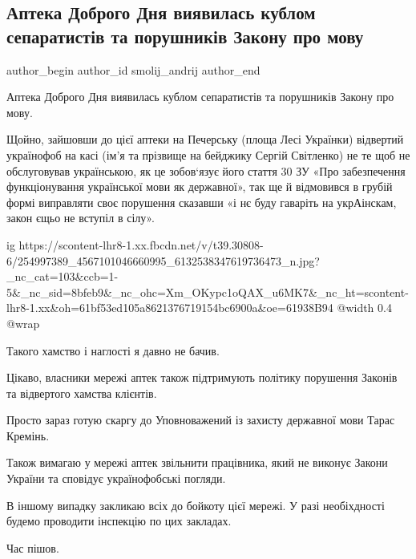  
 
 
 
 
 
\subsection{Аптека Доброго Дня виявилась кублом сепаратистів та порушників Закону про мову}
\label{sec:11_11_2021.fb.smolij_andrij.1.apteka_dobrogo_dnja_mova}
 
\ifcmt
 author_begin
   author_id smolij_andrij
 author_end
\fi

Аптека Доброго Дня виявилась кублом сепаратистів та порушників Закону про мову. 

Щойно, зайшовши до цієї аптеки на Печерську (площа Лесі Українки) відвертий
українофоб на касі (ім’я та прізвище на бейджику Сергій Світленко) не те щоб не
обслуговував українською, як це зобов‘язує його стаття 30 ЗУ «Про забезпечення
функціонування української мови як державної», так ще й відмовився в грубій
формі виправляти своє порушення сказавши «і нє буду гаваріть на укрАінскам,
закон єщьо не вступіл в сілу».

\ifcmt
  ig https://scontent-lhr8-1.xx.fbcdn.net/v/t39.30808-6/254997389_4567101046660995_6132538347619736473_n.jpg?_nc_cat=103&ccb=1-5&_nc_sid=8bfeb9&_nc_ohc=Xm_OKypc1oQAX_u6MK7&_nc_ht=scontent-lhr8-1.xx&oh=61bf53ed105a8621376719154bc6900a&oe=61938B94
  @width 0.4
  @wrap 
\fi

Такого хамство і наглості я давно не бачив.

Цікаво, власники мережі аптек також підтримують політику порушення Законів та
відвертого хамства клієнтів.

Просто зараз готую скаргу до Уповноважений із захисту державної мови Тарас
Кремінь.

Також вимагаю у мережі аптек звільнити працівника, який не виконує Закони
України та сповідує українофобські погляди.

В іншому випадку закликаю всіх до бойкоту цієї мережі. У разі необіхдності
будемо проводити інспекцію по цих закладах. 

Час пішов.

